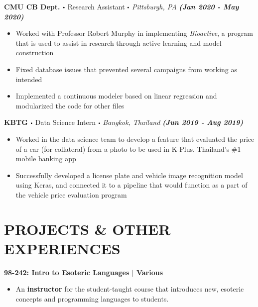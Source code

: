\documentclass[10pt]{article}
\newcommand\sbullet[1][.5]{\mathbin{\vcenter{\hbox{\scalebox{#1}{$\bullet$}}}}}
\begin{document}
  \textbf{\large CMU CB Dept. $\sbullet$} {\large Research Assistant $\sbullet$ \textit{Pittsburgh, PA} \hfill \textit{\textbf{(Jan 2020 - May 2020)}}}

  \vspace*{-0.2cm}
  \begin{itemize}
    \itemsep-0.4em
    \item \textcolor{lighterG}{Worked with Professor Robert Murphy in implementing \textit{Bioactive}, a program that is used to assist in research through active learning and model construction}
    \item \textcolor{lighterG}{Fixed database issues that prevented several campaigns from working as intended}
    \item \textcolor{lighterG}{Implemented a continuous modeler based on linear regression and modularized the code for other files}
  \end{itemize}

  \textbf{\large KBTG $\sbullet$} {\large Data Science Intern $\sbullet$ \textit{Bangkok, Thailand} \hfill \textit{\textbf{(Jun 2019 - Aug 2019)}}}

  \vspace*{-0.2cm}
  \begin{itemize}
    \itemsep-0.4em
    \item \textcolor{lighterG}{Worked in the data science team to develop a feature that evaluated the price of a car (for collateral) from a photo to be used in K-Plus, Thailand's \#1 mobile banking app}
    \item \textcolor{lighterG}{Successfully developed a license plate and vehicle image recognition model using Keras, and connected it to a pipeline that would function as a part of the vehicle price evaluation program}
  \end{itemize}

  \section*{\large \textcolor{lighterB}{PROJECTS \& OTHER EXPERIENCES}}
  \vspace*{-0.23cm}

  \textbf{\large {98-242: Intro to Esoteric Languages} $\mid$ Various} 
  \vspace*{-0.17cm}
  \begin{itemize}
    \itemsep0em
    \item \textcolor{lighterG}{An \textbf{instructor} for the student-taught course that introduces new, esoteric concepts and programming languages to students}.
  \end{itemize}
\end{document}
